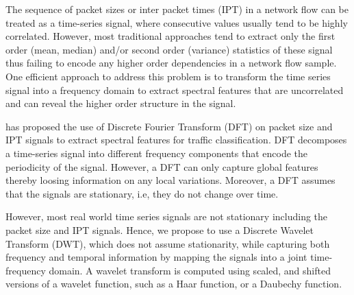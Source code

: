 \documentclass[12pt]{amsart}
\begin{document}
The sequence of packet sizes or inter packet times (IPT) in a network flow can be treated as a time-series signal, where consecutive values usually tend to be highly correlated. However, most traditional approaches tend to extract only the first order (mean, median) and/or second order (variance) statistics of these signal thus failing to encode any higher order dependencies in a network flow sample. One efficient approach to address this problem is to transform the time series signal into a frequency domain to extract spectral features that are uncorrelated and can reveal the higher order structure in the signal.

\cite{} has proposed the use of Discrete Fourier Transform (DFT) on packet size and IPT signals to extract spectral features for traffic classification. DFT decomposes a time-series signal into different frequency components that encode the periodicity of the signal. However, a DFT can only capture global features thereby loosing information on any local variations. Moreover, a DFT assumes that the signals are stationary, i.e, they do not change over time. 

However, most real world time series signals are not stationary including the packet size and IPT signals. Hence, we propose to use a Discrete Wavelet Transform (DWT), which does not assume stationarity, while capturing both frequency and temporal information by mapping the signals into a joint time-frequency domain. A wavelet transform is computed using scaled, and shifted versions of a wavelet function, such as a Haar function, or a Daubechy function.  

\end{document}
